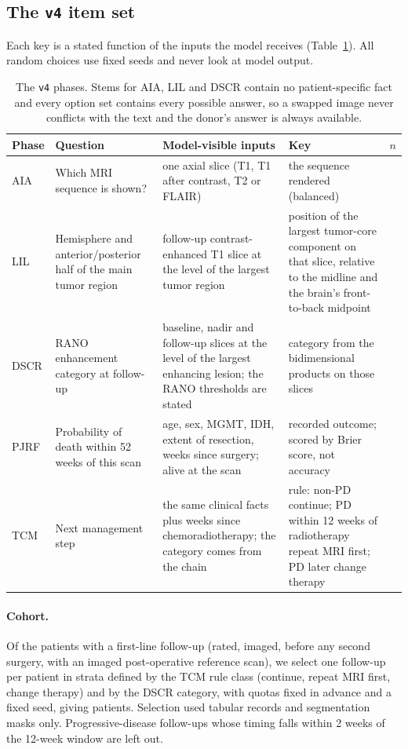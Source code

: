 \subsection{The \texttt{v4} item set}
\label{sec:v4}

Each key is a stated function of the inputs the model receives (Table~\ref{tab:phases}). All random choices use fixed seeds and never look at model output.

\begin{table}[t]
\centering
\footnotesize
\setlength{\tabcolsep}{3pt}
\begin{tabular}{p{0.7cm}p{4.6cm}p{4.4cm}p{4.4cm}r}
\toprule
Phase & Question & Model-visible inputs & Key & $n$ \\
\midrule
AIA & Which MRI sequence is shown? & one axial slice (T1, T1 after contrast, T2 or FLAIR) & the sequence rendered (balanced) & \vfourNAIA{} \\
LIL & Hemisphere and anterior/posterior half of the main tumor region & follow-up contrast-enhanced T1 slice at the level of the largest tumor region & position of the largest tumor-core component on that slice, relative to the midline and the brain's front-to-back midpoint & \vfourNLIL{} \\
DSCR & RANO enhancement category at follow-up & baseline, nadir and follow-up slices at the level of the largest enhancing lesion; the RANO thresholds are stated & category from the bidimensional products on those slices & \vfourNDSCR{} \\
PJRF & Probability of death within 52 weeks of this scan & age, sex, MGMT, IDH, extent of resection, weeks since surgery; alive at the scan & recorded outcome; scored by Brier score, not accuracy & \vfourNPJRF{} \\
TCM & Next management step & the same clinical facts plus weeks since chemoradiotherapy; the category comes from the chain & rule: non-PD continue; PD within 12 weeks of radiotherapy repeat MRI first; PD later change therapy & \vfourNTCM{} \\
\bottomrule
\end{tabular}
\caption{The \texttt{v4} phases. Stems for AIA, LIL and DSCR contain no patient-specific fact and every option set contains every possible answer, so a swapped image never conflicts with the text and the donor's answer is always available.}
\label{tab:phases}
\end{table}

\paragraph{Cohort.} Of the patients with a first-line follow-up (rated, imaged, before any second surgery, with an imaged post-operative reference scan), we select one follow-up per patient in strata defined by the TCM rule class (continue, repeat MRI first, change therapy) and by the DSCR category, with quotas fixed in advance and a fixed seed, giving \vfourPatients{} patients. Selection used tabular records and segmentation masks only. Progressive-disease follow-ups whose timing falls within 2 weeks of the 12-week window are left out.

